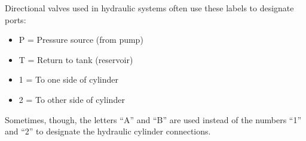 





Directional valves used in hydraulic systems often use these labels to designate ports:

\begin{itemize}
\item{} P = Pressure source (from pump)
\item{} T = Return to tank (reservoir)
\item{} 1 = To one side of cylinder
\item{} 2 = To other side of cylinder
\end{itemize}

Sometimes, though, the letters ``A'' and ``B'' are used instead of the numbers ``1'' and ``2'' to designate the hydraulic cylinder connections.




